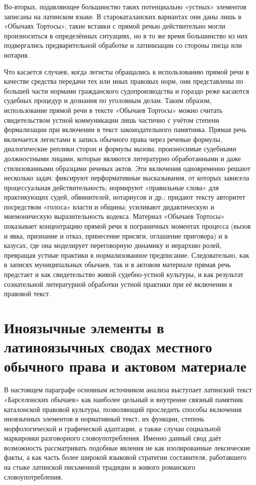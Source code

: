 Во-вторых, подавляющее большинство таких потенциально «устных» элементов записаны на латинском языке. В старокаталанских вариантах они даны лишь в «Обычаях Тортосы»; такие вставки с прямой речью действительно могли произноситься в определённых ситуациях, но в то же время большинство из них подвергались предварительной обработке и латинизации со стороны писца или нотария.

Что касается случаев, когда легисты обращались к использованию прямой речи в качестве средства передачи тех или иных правовых норм, они представлены по большей части нормами гражданского судопроизводства и гораздо реже касаются судебных процедур и дознания по уголовным делам. Таким образом, использование прямой речи в тексте «Обычаев Тортосы» можно считать свидетельством устной коммуникации лишь частично с учётом степени формализации при включении в текст законодательного памятника. Прямая речь включается легистами в запись обычного права через речевые формулы, диалогические реплики сторон и формулы вызова, произносимые судебными должностными лицами, которые являются литературно обработанными и даже стилизованными образцами речевых актов. Эти включения одновременно решают несколько задач: фиксируют перформативные высказывания, от которых зависела процессуальная действительность; нормируют «правильные слова» для практикующих судей, обвинителей, нотариусов и др.; придают тексту авторитет посредством «голоса» власти и общины; усиливают дидактическую и мнемоническую выразительность кодекса. Материал «Обычаев Тортосы» показывает концентрацию прямой речи в пограничных моментах процесса (вызов и явка, признание и отказ, принесение присяги, оглашение приговора) и в казусах, где она моделирует переговорную динамику и иерархию ролей, превращая устные практики в нормализованное предписание. Следовательно, как в записях муниципальных обычаев, так и в актовом материале прямая речь предстает и как свидетельство живой судебно-устной культуры, и как результат сознательной литературной обработки устной практики при её включении в правовой текст.

\section{Иноязычные элементы в латиноязычных сводах местного обычного права и актовом материале}

В настоящем параграфе основным источником анализа выступает латинский текст «Барселонских обычаев» как наиболее цельный и внутренне связный памятник каталонской правовой культуры, позволяющий проследить способы включения иноязычных элементов в нормативный текст, их функции, степень морфологической и графической адаптации, а также случаи социальной маркировки разговорного словоупотребления. Именно данный свод даёт возможность рассматривать подобные явления не как изолированные лексические факты, а как часть более широкой языковой стратегии составителя, работавшего на стыке латинской письменной традиции и живого романского словоупотребления.

